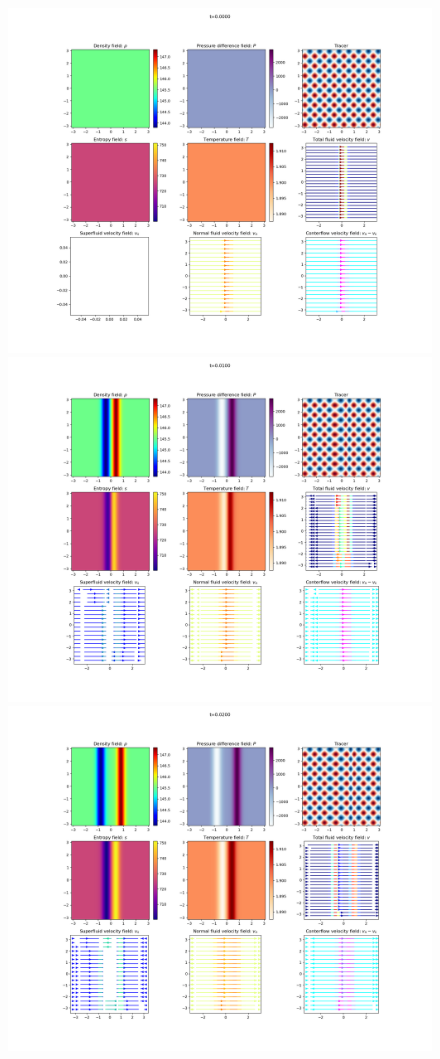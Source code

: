 \documentclass{article}
\begin{document}
\begin{figure}[h]
    \includegraphics[width=\textwidth/2]{Sim 1/SF01_0000.png}
    \includegraphics[width=\textwidth/2]{Sim 1/SF01_0020.png}
    \includegraphics[width=\textwidth/2]{Sim 1/SF01_0040.png}

\end{figure}
\end{document}
